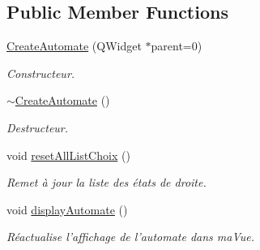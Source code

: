 \subsection*{Public Member Functions}
\begin{DoxyCompactItemize}
\item 
\hyperlink{class_create_automate_a564b1212466be9837975faf60f115862}{Create\-Automate} (Q\-Widget $\ast$parent=0)
\begin{DoxyCompactList}\small\item\em Constructeur. \end{DoxyCompactList}\item 
\hypertarget{class_create_automate_a936c5cf4d629a68ede5779b656061428}{\hyperlink{class_create_automate_a936c5cf4d629a68ede5779b656061428}{$\sim$\-Create\-Automate} ()}\label{class_create_automate_a936c5cf4d629a68ede5779b656061428}

\begin{DoxyCompactList}\small\item\em Destructeur. \end{DoxyCompactList}\item 
\hypertarget{class_create_automate_a13c0f6c01986d1ef1173c84e7ff01768}{void \hyperlink{class_create_automate_a13c0f6c01986d1ef1173c84e7ff01768}{reset\-All\-List\-Choix} ()}\label{class_create_automate_a13c0f6c01986d1ef1173c84e7ff01768}

\begin{DoxyCompactList}\small\item\em Remet à jour la liste des états de droite. \end{DoxyCompactList}\item 
\hypertarget{class_create_automate_ae3ab55bac630576c180865589a10c765}{void \hyperlink{class_create_automate_ae3ab55bac630576c180865589a10c765}{display\-Automate} ()}\label{class_create_automate_ae3ab55bac630576c180865589a10c765}

\begin{DoxyCompactList}\small\item\em Réactualise l'affichage de l'automate dans ma\-Vue. \end{DoxyCompactList}\end{DoxyCompactItemize}
